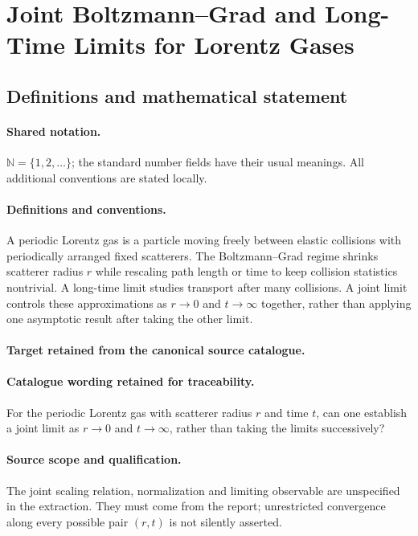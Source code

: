 \documentclass[11pt]{article}
\begin{document}
\section{Joint Boltzmann–Grad and Long-Time Limits for Lorentz Gases}\label{statement}

\subsection{Definitions and mathematical statement}

\paragraph{Shared notation.}$\mathbb N=\{1,2,\ldots\}$; the standard number fields have their usual meanings. All additional conventions are stated locally.


\paragraph{Definitions and conventions.}
A periodic Lorentz gas is a particle moving freely between elastic collisions with periodically arranged fixed scatterers. The Boltzmann--Grad regime shrinks scatterer radius $r$ while rescaling path length or time to keep collision statistics nontrivial. A long-time limit studies transport after many collisions. A joint limit controls these approximations as $r\to0$ and $t\to\infty$ together, rather than applying one asymptotic result after taking the other limit.

\paragraph{Target retained from the canonical source catalogue.}
\paragraph{Catalogue wording retained for traceability.}
For the periodic Lorentz gas with scatterer radius $r$ and time $t$, can one establish a joint limit as $r\to0$ and $t\to\infty$, rather than taking the limits successively?

\paragraph{Source scope and qualification.}
The joint scaling relation, normalization and limiting observable are unspecified in the extraction. They must come from the report; unrestricted convergence along every possible pair $(r,t)$ is not silently asserted.
\end{document}
